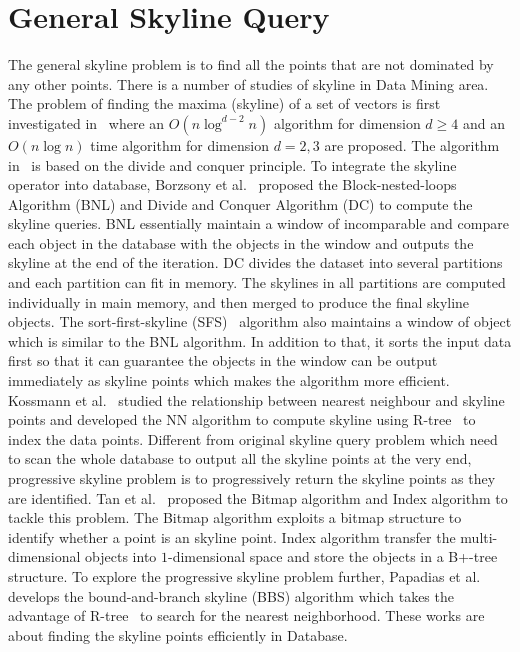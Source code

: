 \section{General Skyline Query}
\label{sec:rel:general}
The general skyline problem is to find all the points that are not dominated by any other points.
There is a number of studies of skyline in Data Mining area. The problem of finding the maxima (skyline) of a set of vectors is first investigated in~\cite{kung1975finding} where an $O(n\log ^{d-2}n)$ algorithm for dimension $d\geq 4$ and an $O(n\log n)$ time algorithm for dimension $d = 2, 3$ are proposed. The algorithm in~\cite{kung1975finding} is based on the divide and conquer principle. To integrate the skyline operator into database, Borzsony et al.~\cite{borzsony2001skyline} proposed the Block-nested-loops Algorithm (BNL) and Divide and Conquer Algorithm (DC) to compute the skyline queries. BNL essentially maintain a window of incomparable and compare each object in the database with the objects in the window and outputs the skyline at the end of the iteration. DC divides the dataset into several partitions and each partition can fit in memory. The skylines in all partitions are computed individually in main memory, and then merged to produce the final skyline objects. 
The sort-first-skyline (SFS)~\cite{chomicki2003skyline} algorithm also maintains a window of object which is similar to the BNL algorithm. In addition to that, it sorts the input data first so that it can guarantee the objects in the window can be output immediately as skyline points which makes the algorithm more efficient.
Kossmann et al.~\cite{kossmann2002shooting} studied the relationship between nearest neighbour and skyline points and developed the NN algorithm to compute skyline using R-tree~\cite{beckmann1990r} to index the data points.
Different from original skyline query problem which need to scan the whole database to output all the skyline points at the very end, progressive skyline problem is to progressively return the skyline points as they are identified. Tan et al.~\cite{tan2001efficient} proposed the Bitmap algorithm and Index algorithm to tackle this problem. The Bitmap algorithm exploits a bitmap structure to identify whether a point is an skyline point. Index algorithm transfer the multi-dimensional objects into $1$-dimensional space and store the objects in a B+-tree structure. To explore the progressive skyline problem further, Papadias et al.~\cite{papadias2003optimal, papadias2005progressive} develops the bound-and-branch skyline (BBS) algorithm which takes the advantage of R-tree~\cite{beckmann1990r} to search for the nearest neighborhood. These works are about finding the skyline points efficiently in Database. 

